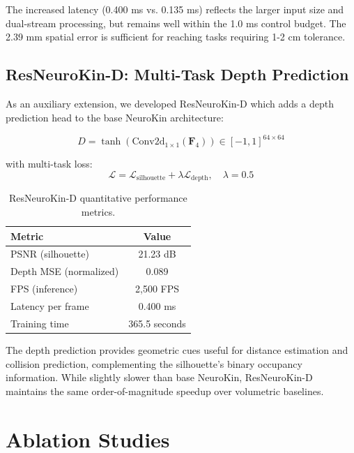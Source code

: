 ﻿\documentclass[12pt,a4paper,oneside]{report}
\begin{document}
The increased latency (0.400 ms vs. 0.135 ms) reflects the larger input size and dual-stream processing, but remains well within the 1.0 ms control budget. The 2.39 mm spatial error is sufficient for reaching tasks requiring 1-2 cm tolerance.

\subsection{ResNeuroKin-D: Multi-Task Depth Prediction}

As an auxiliary extension, we developed ResNeuroKin-D which adds a depth prediction head to the base NeuroKin architecture:

\begin{equation}
\hat{D} = \tanh(\text{Conv2d}_{1\times1}(\mathbf{F}_4)) \in [-1, 1]^{64 \times 64}
\end{equation}

with multi-task loss:
\begin{equation}
\mathcal{L} = \mathcal{L}_{\text{silhouette}} + \lambda \mathcal{L}_{\text{depth}}, \quad \lambda = 0.5
\end{equation}

\begin{table}[H]
\centering
\caption{ResNeuroKin-D quantitative performance metrics.}
\label{tab:resneurokin_performance}
\begin{tabular}{lc}
\toprule
Metric & Value \\
\midrule
PSNR (silhouette) & 21.23 dB \\
Depth MSE (normalized) & 0.089 \\
FPS (inference) & 2,500 FPS \\
Latency per frame & 0.400 ms \\
Training time & 365.5 seconds \\
\bottomrule
\end{tabular}
\end{table}

The depth prediction provides geometric cues useful for distance estimation and collision prediction, complementing the silhouette's binary occupancy information. While slightly slower than base NeuroKin, ResNeuroKin-D maintains the same order-of-magnitude speedup over volumetric baselines.

\section{Ablation Studies}
\end{document}
